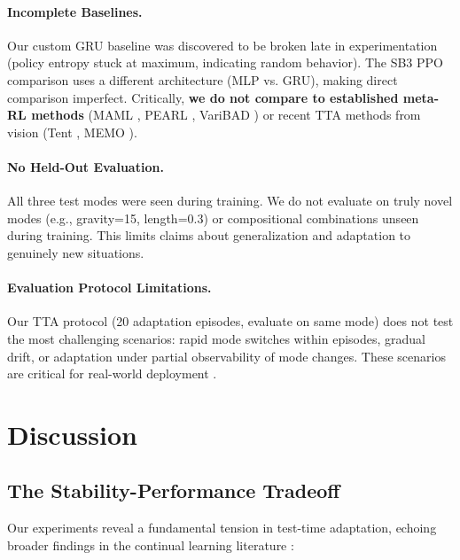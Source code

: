 \documentclass{article}
\begin{document}
\paragraph{Incomplete Baselines.} Our custom GRU baseline was discovered to be broken late in experimentation (policy entropy stuck at maximum, indicating random behavior). The SB3 PPO comparison \citep{stable-baselines3} uses a different architecture (MLP vs. GRU), making direct comparison imperfect. Critically, \textbf{we do not compare to established meta-RL methods} (MAML \citep{finn2017maml}, PEARL \citep{rakelly2019efficient}, VariBAD \citep{zintgraf2020varibad}) or recent TTA methods from vision (Tent \citep{wang2021tent}, MEMO \citep{zhang2022memo}).

\paragraph{No Held-Out Evaluation.} All three test modes were seen during training. We do not evaluate on truly novel modes (e.g., gravity=15, length=0.3) or compositional combinations unseen during training. This limits claims about generalization and adaptation to genuinely new situations.

\paragraph{Evaluation Protocol Limitations.} Our TTA protocol (20 adaptation episodes, evaluate on same mode) does not test the most challenging scenarios: rapid mode switches within episodes, gradual drift, or adaptation under partial observability of mode changes. These scenarios are critical for real-world deployment \citep{padakandla2020survey}.

\section{Discussion}
\label{sec:discussion}

\subsection{The Stability-Performance Tradeoff}

Our experiments reveal a fundamental tension in test-time adaptation, echoing broader findings in the continual learning literature \citep{parisi2019continual}:
\end{document}
